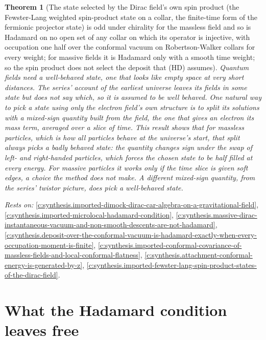 \documentclass[11pt]{article}
\newtheorem{theorem}{Theorem}[section]
\theoremstyle{definition}
\theoremstyle{plain}
\begin{document}
\begin{theorem}[The state selected by the Dirac field's own spin product (the Fewster-Lang weighted spin-product state on a collar, the finite-time form of the fermionic projector state) is odd under chirality for the massless field and so is Hadamard on no open set of any collar on which its operator is injective, with occupation one half over the conformal vacuum on Robertson-Walker collars for every weight; for massive fields it is Hadamard only with a smooth time weight; so the spin product does not select the deposit that (HD) assumes]\label{c:synthesis.spin-product-state-of-the-massless-dirac-field-is-odd-under-chirality-and-never-hadamard}
Quantum fields need a well-behaved state, one that looks like empty space at very short distances. The series' account of the earliest universe leaves its fields in some state but does not say which, so it is assumed to be well behaved. One natural way to pick a state using only the electron field's own structure is to split its solutions with a mixed-sign quantity built from the field, the one that gives an electron its mass term, averaged over a slice of time. This result shows that for massless particles, which is how all particles behave at the universe's start, that split always picks a badly behaved state: the quantity changes sign under the swap of left- and right-handed particles, which forces the chosen state to be half filled at every energy. For massive particles it works only if the time slice is given soft edges, a choice the method does not make. A different mixed-sign quantity, from the series' twistor picture, does pick a well-behaved state.
\end{theorem}
\noindent\emph{Rests on:} \ref{c:synthesis.imported-dimock-dirac-car-algebra-on-a-gravitational-field}, \ref{c:synthesis.imported-microlocal-hadamard-condition}, \ref{c:synthesis.massive-dirac-instantaneous-vacuum-and-non-smooth-descents-are-not-hadamard}, \ref{c:synthesis.deposit-over-the-conformal-vacuum-is-hadamard-exactly-when-every-occupation-moment-is-finite}, \ref{c:synthesis.imported-conformal-covariance-of-massless-fields-and-local-conformal-flatness}, \ref{c:synthesis.attachment-conformal-energy-is-generated-by-z}, \ref{c:synthesis.imported-fewster-lang-spin-product-states-of-the-dirac-field}.

\section{What the Hadamard condition leaves free}
\end{document}
